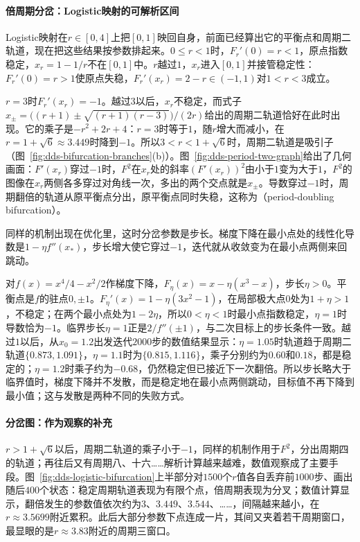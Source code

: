 \paragraph{倍周期分岔：Logistic映射的可解析区间}
Logistic映射在$r\in[0,4]$上把$[0,1]$映回自身，前面已经算出它的平衡点和周期二轨道，现在把这些结果按参数排起来。$0\leq r<1$时，$F_r'(0)=r<1$，原点指数稳定，$x_r=1-1/r$不在$[0,1]$中。$r$越过$1$，$x_r$进入$[0,1]$并接管稳定性：$F_r'(0)=r>1$使原点失稳，$F_r'(x_r)=2-r\in(-1,1)$对$1<r<3$成立。

$r=3$时$F_r'(x_r)=-1$。越过$3$以后，$x_r$不稳定，而式子$x_\pm=\bigl((r+1)\pm\sqrt{(r+1)(r-3)}\bigr)/(2r)$给出的周期二轨道恰好在此时出现。它的乘子是$-r^2+2r+4$：$r=3$时等于$1$，随$r$增大而减小，在$r=1+\sqrt6\approx3.449$时降到$-1$。所以$3<r<1+\sqrt6$时，周期二轨道是吸引子（图~\ref{fig:dds-bifurcation-branches}(b)）。图~\ref{fig:dds-period-two-graph}给出了几何画面：$F'(x_r)$穿过$-1$时，$F^2$在$x_r$处的斜率$(F'(x_r))^2$由小于$1$变为大于$1$，$F^2$的图像在$x_r$两侧各多穿过对角线一次，多出的两个交点就是$x_\pm$。导数穿过$-1$时，周期翻倍的轨道从原平衡点分出，原平衡点同时失稳，这称为（period-doubling bifurcation）。

同样的机制出现在优化里，这时分岔参数是步长。梯度下降在最小点处的线性化导数是$1-\eta f''(x_*)$，步长增大使它穿过$-1$，迭代就从收敛变为在最小点两侧来回跳动。

\begin{example}[步长引起的倍周期分岔]
\label{ex:dds-step-size-bifurcation}
对$f(x)=x^4/4-x^2/2$作梯度下降，$F_\eta(x)=x-\eta(x^3-x)$，步长$\eta>0$。平衡点是$f$的驻点$0,\pm1$。$F_\eta'(x)=1-\eta(3x^2-1)$，在局部极大点$0$处为$1+\eta>1$，不稳定；在两个最小点处为$1-2\eta$，所以$0<\eta<1$时最小点指数稳定，$\eta=1$时导数恰为$-1$。临界步长$\eta=1$正是$2/f''(\pm1)$，与二次目标上的步长条件一致。越过$1$以后，从$x_0=1.2$出发迭代$2000$步的数值结果显示：$\eta=1.05$时轨道趋于周期二轨道$\{0.873,1.091\}$，$\eta=1.1$时为$\{0.815,1.116\}$，乘子分别约为$0.60$和$0.18$，都是稳定的；$\eta=1.2$时乘子约为$-0.68$，仍然稳定但已接近下一次翻倍。所以步长略大于临界值时，梯度下降并不发散，而是稳定地在最小点两侧跳动，目标值不再下降到最小值；这与发散是两种不同的失败方式。
\end{example}

\paragraph{分岔图：作为观察的补充}
$r>1+\sqrt6$以后，周期二轨道的乘子小于$-1$，同样的机制作用于$F^2$，分出周期四的轨道；再往后又有周期八、十六……解析计算越来越难，数值观察成了主要手段。图~\ref{fig:dds-logistic-bifurcation}上半部分对$1500$个$r$值各自丢弃前$1000$步、画出随后$400$个状态：稳定周期轨道表现为有限个点，倍周期表现为分叉；数值计算显示，翻倍发生的参数值依次约为$3$、$3.449$、$3.544$、……，间隔越来越小，在$r\approx3.5699$附近累积。此后大部分参数下点连成一片，其间又夹着若干周期窗口，最显眼的是$r\approx3.83$附近的周期三窗口。

